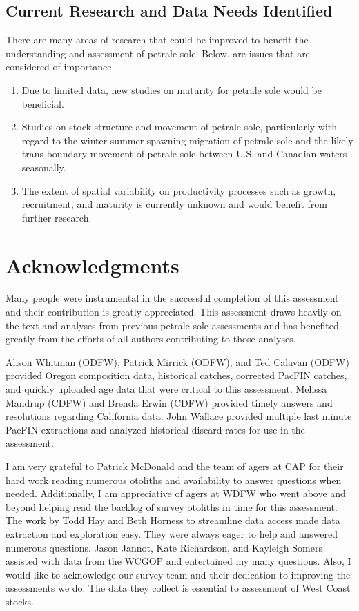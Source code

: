 \documentclass[12pt,]{article}
\begin{document}
\subsection{Current Research and Data Needs
Identified}\label{current-research-and-data-needs-identified}

There are many areas of research that could be improved to benefit the
understanding and assessment of petrale sole. Below, are issues that are
considered of importance.

\begin{enumerate}

\item Due to limited data, new studies on maturity  for petrale sole would be beneficial.

\item Studies on stock structure and movement of petrale sole, particularly with regard to the winter-summer spawning migration of petrale sole and the likely trans-boundary movement of petrale sole between U.S. and Canadian waters seasonally.

\item The extent of spatial variability on productivity processes such as growth, recruitment, and maturity is currently unknown and would benefit from further research.

\end{enumerate}

\section{Acknowledgments}\label{acknowledgments}

Many people were instrumental in the successful completion of this
assessment and their contribution is greatly appreciated. This
assessment draws heavily on the text and analyses from previous petrale
sole assessments and has benefited greatly from the efforts of all
authors contributing to those analyses.

Alison Whitman (ODFW), Patrick Mirrick (ODFW), and Ted Calavan (ODFW)
provided Oregon composition data, historical catches, corrected PacFIN
catches, and quickly uploaded age data that were critical to this
assessment. Melissa Mandrup (CDFW) and Brenda Erwin (CDFW) provided
timely answers and resolutions regarding California data. John Wallace
provided multiple last minute PacFIN extractions and analyzed historical
discard rates for use in the assessment.

I am very grateful to Patrick McDonald and the team of agers at CAP for
their hard work reading numerous otoliths and availability to answer
questions when needed. Additionally, I am appreciative of agers at WDFW
who went above and beyond helping read the backlog of survey otoliths in
time for this assessment. The work by Todd Hay and Beth Horness to
streamline data access made data extraction and exploration easy. They
were always eager to help and answered numerous questions. Jason Jannot,
Kate Richardson, and Kayleigh Somers assisted with data from the WCGOP
and entertained my many questions. Also, I would like to acknowledge our
survey team and their dedication to improving the assessments we do. The
data they collect is essential to assessment of West Coast stocks.
\end{document}
